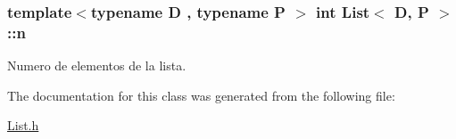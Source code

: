 \subsubsection[{\texorpdfstring{n}{n}}]{\setlength{\rightskip}{0pt plus 5cm}template$<$typename D , typename P $>$ int {\bf List}$<$ D, P $>$\+::n\hspace{0.3cm}{\ttfamily [protected]}}\hypertarget{classList_aa61221b9bda8b2b56a61bd869daacbfd}{}\label{classList_aa61221b9bda8b2b56a61bd869daacbfd}


Numero de elementos de la lista. 



The documentation for this class was generated from the following file\+:\begin{DoxyCompactItemize}
\item 
\hyperlink{List_8h}{List.\+h}\end{DoxyCompactItemize}
